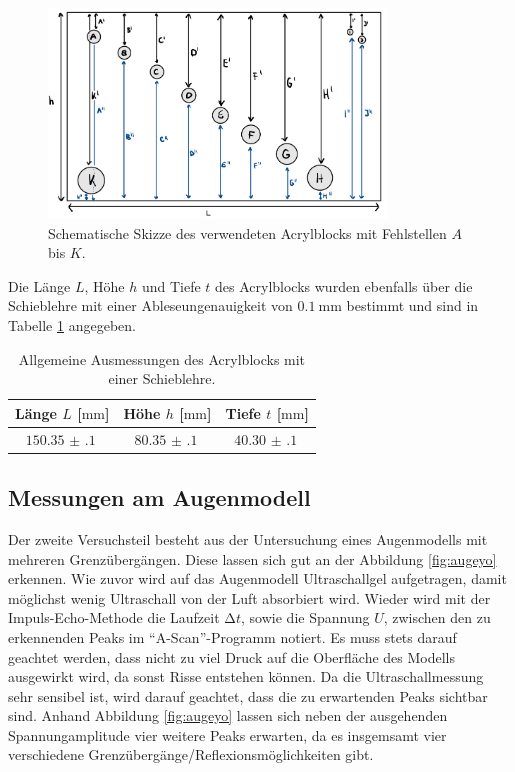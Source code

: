 \begin{figure}
    \centering
    \includegraphics[width=0.8\textwidth]{bilderlit/skizze.png}
    \caption{Schematische Skizze des verwendeten Acrylblocks mit Fehlstellen $A$ bis $K$.} 
    \label{fig:skizzeyo}
\end{figure}

Die Länge $L$, Höhe $h$ und Tiefe $t$ des Acrylblocks wurden ebenfalls über die Schieblehre mit einer Ableseungenauigkeit von $\SI{0.1}{\milli\meter}$
bestimmt und sind in Tabelle \ref{tab:ausmessunggrob} angegeben.

\begin{table}
    \centering
    \caption{Allgemeine Ausmessungen des Acrylblocks mit einer Schieblehre.}
    \label{tab:ausmessunggrob}
    \begin{tabular}{c c c}
        \toprule
        Länge  $L$ [$\si{\milli\meter}$] & Höhe $h$ [$\si{\milli\meter}$]& Tiefe $t$ [$\si{\milli\meter}$] \\
        \midrule
        $\SI{150.35(10)}{}$ & $\SI{80.35(10)}{}$ & $\SI{40.30(10)}{}$ \\
        \bottomrule
    \end{tabular}
\end{table}

\subsection{Messungen am Augenmodell}

Der zweite Versuchsteil besteht aus der Untersuchung eines Augenmodells mit mehreren Grenzübergängen. Diese lassen sich gut an der Abbildung \ref{fig:augeyo} erkennen. Wie zuvor wird auf das Augenmodell Ultraschallgel aufgetragen, damit möglichst wenig
Ultraschall von der Luft absorbiert wird. Wieder wird mit der Impuls-Echo-Methode die Laufzeit $\increment t$, sowie die Spannung $U$, zwischen den zu erkennenden Peaks im \enquote{A-Scan}-Programm notiert. Es muss stets darauf geachtet werden, dass
nicht zu viel Druck auf die Oberfläche des Modells ausgewirkt wird, da sonst Risse entstehen können. Da die Ultraschallmessung sehr sensibel ist, wird darauf geachtet, dass die zu erwartenden Peaks sichtbar sind. Anhand Abbildung \ref{fig:augeyo} lassen sich
neben der ausgehenden Spannungamplitude vier weitere Peaks erwarten, da es insgemsamt vier verschiedene Grenzübergänge/Reflexionsmöglichkeiten gibt.

